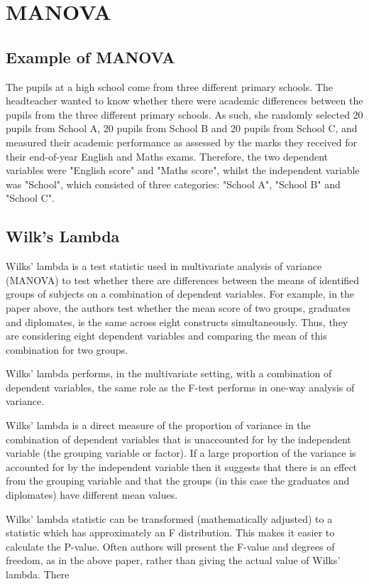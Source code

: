 
\newpage
\section{MANOVA}
\subsection{Example of MANOVA}
The pupils at a high school come from three different primary schools. The headteacher wanted to know whether there were academic differences between the pupils from the three different primary schools. As such, she randomly selected 20 pupils from School A, 20 pupils from School B and 20 pupils from School C, and measured their academic performance as assessed by the marks they received for their end-of-year English and Maths exams. Therefore, the two dependent variables were "English score" and "Maths score", whilst the independent variable was "School", which consisted of three categories: "School A", "School B" and "School C".



\subsection{Wilk's Lambda}

Wilks' lambda is a test statistic used in multivariate analysis of variance
(MANOVA) to test whether there are differences between the means of
identified groups of subjects on a combination of dependent variables. For
example, in the paper above, the authors test whether the mean score of two
groups, graduates and diplomates, is the same across eight constructs
simultaneously. Thus, they are considering eight dependent variables and
comparing the mean of this combination for two groups.

Wilks' lambda performs, in the multivariate setting, with a combination of
dependent variables, the same role as the F-test performs in one-way analysis
of variance. 

Wilks' lambda is a direct measure of the proportion of variance in
the combination of dependent variables that is unaccounted for by the
independent variable (the grouping variable or factor). If a large proportion
of the variance is accounted for by the independent variable then it suggests
that there is an effect from the grouping variable and that the groups (in this
case the graduates and diplomates) have different mean values.

Wilks' lambda statistic can be transformed (mathematically adjusted) to a
statistic which has approximately an F distribution. This makes it easier to
calculate the P-value. Often authors will present the F-value and degrees of
freedom, as in the above paper, rather than giving the actual value of Wilks'
lambda.
There

